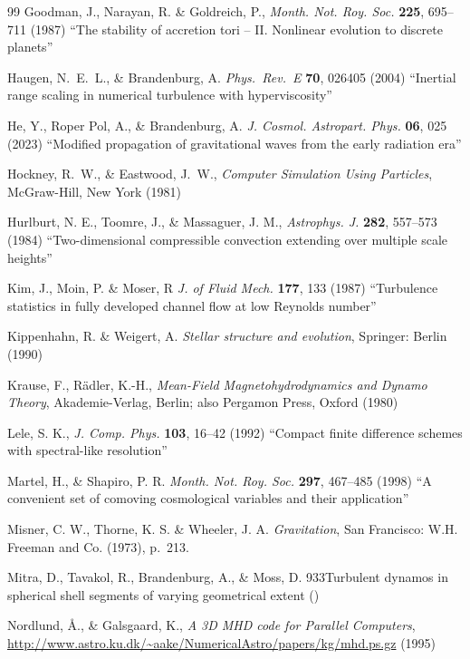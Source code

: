\documentclass[\mydriver,12pt,twoside,notitlepage,a4paper]{article}
\begin{document}
\begin{thebibliography}{99}
Goodman, J., Narayan, R. \& Goldreich, P.,
  \emph{Month. Not. Roy. Soc.} \textbf{225}, 695--711 (1987)
  ``The stability of accretion tori -- II. Nonlinear evolution
  to discrete planets''

Haugen, N.~E.~L., \& Brandenburg, A.
  \emph{Phys.~Rev.~E} \textbf{70}, 026405 (2004)
  ``Inertial range scaling in numerical turbulence with hyperviscosity''

 He, Y., Roper Pol, A., \& Brandenburg, A.
  \emph{J. Cosmol. Astropart. Phys.} \textbf{06}, 025 (2023)
  ``Modified propagation of gravitational waves from the early radiation era''

Hockney, R.~W., \& Eastwood, J.~W.,
  \emph{Computer Simulation Using Particles},
  McGraw-Hill, New York (1981)

Hurlburt, N. E., Toomre, J., \& Massaguer, J. M.,
  \emph{Astrophys. J.} \textbf{282}, 557--573 (1984)
  ``Two-dimensional compressible convection extending over multiple scale
  heights''

 Kim, J., Moin, P. \& Moser, R
\emph{J. of Fluid Mech.} \textbf{177}, 133 (1987)
``Turbulence statistics in fully developed channel flow at low Reynolds number''

 Kippenhahn, R. \& Weigert, A.
  \emph{Stellar structure and evolution}, Springer: Berlin (1990)

 Krause, F., R\"adler, K.-H.,
  \emph{Mean-Field Magneto\-hy\-dro\-dy\-na\-mics and Dynamo Theory\/},
  Akademie-Verlag, Berlin; also Pergamon Press, Oxford (1980)

Lele, S. K.,
  \emph{J. Comp. Phys.} \textbf{103}, 16--42 (1992)
  ``Compact finite difference schemes with spectral-like resolution''

 Martel, H., \& Shapiro, P. R.
  \emph{Month. Not. Roy. Soc.} \textbf{297}, 467--485 (1998)
  ``A convenient set of comoving cosmological variables and their application''

 Misner, C. W., Thorne, K. S. \& Wheeler, J. A.
  \emph{Gravitation},
  San Francisco: W.H. Freeman and Co. (1973), p.~213.

 Mitra, D., Tavakol, R., Brandenburg, A., \& Moss, D.
{933}{Turbulent dynamos in spherical shell segments of varying geometrical extent} ()

 Nordlund, \AA., \& Galsgaard, K.,
{\it A 3D MHD code for Parallel Computers},
{\url{http://www.astro.ku.dk/~aake/NumericalAstro/papers/kg/mhd.ps.gz}}
(1995)


\end{thebibliography}
\end{document}
